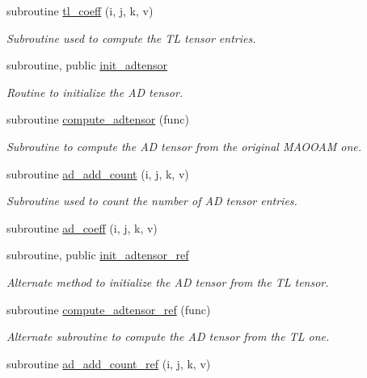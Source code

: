 \begin{DoxyCompactItemize}
subroutine \hyperlink{namespacetl__ad__tensor_a0e37e78de771af0205bd80a30c911a68}{tl\+\_\+coeff} (i, j, k, v)
\begin{DoxyCompactList}\small\item\em Subroutine used to compute the TL tensor entries. \end{DoxyCompactList}\item 
subroutine, public \hyperlink{namespacetl__ad__tensor_a199cc07a7172f6cf662f9a5bd6f3d45c}{init\+\_\+adtensor}
\begin{DoxyCompactList}\small\item\em Routine to initialize the AD tensor. \end{DoxyCompactList}\item 
subroutine \hyperlink{namespacetl__ad__tensor_a9437eafe79ee3b0b89cd67af4956fba0}{compute\+\_\+adtensor} (func)
\begin{DoxyCompactList}\small\item\em Subroutine to compute the AD tensor from the original M\+A\+O\+O\+AM one. \end{DoxyCompactList}\item 
subroutine \hyperlink{namespacetl__ad__tensor_a0ba0f9d4f9182a49209483749b6d5e10}{ad\+\_\+add\+\_\+count} (i, j, k, v)
\begin{DoxyCompactList}\small\item\em Subroutine used to count the number of AD tensor entries. \end{DoxyCompactList}\item 
subroutine \hyperlink{namespacetl__ad__tensor_a177e8f1ebac5de029f565ef7624926f2}{ad\+\_\+coeff} (i, j, k, v)
\item 
subroutine, public \hyperlink{namespacetl__ad__tensor_a3b666898a684bf3f2e932f38616fc920}{init\+\_\+adtensor\+\_\+ref}
\begin{DoxyCompactList}\small\item\em Alternate method to initialize the AD tensor from the TL tensor. \end{DoxyCompactList}\item 
subroutine \hyperlink{namespacetl__ad__tensor_a154e946ce2d6720a48a675ba92a7f350}{compute\+\_\+adtensor\+\_\+ref} (func)
\begin{DoxyCompactList}\small\item\em Alternate subroutine to compute the AD tensor from the TL one. \end{DoxyCompactList}\item 
subroutine \hyperlink{namespacetl__ad__tensor_a3c0b4e0e1f18a0f85b874542b76cfa8a}{ad\+\_\+add\+\_\+count\+\_\+ref} (i, j, k, v)

\end{DoxyCompactItemize}
